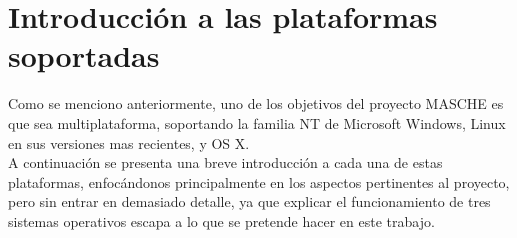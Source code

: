 \section{Introducción a las plataformas soportadas}

Como se menciono anteriormente, uno de los objetivos del proyecto MASCHE es que
sea multiplataforma, soportando la familia NT de Microsoft Windows, Linux en
sus versiones mas recientes, y OS X.\\

A continuación se presenta una breve introducción a cada una de estas
plataformas, enfocándonos principalmente en los aspectos pertinentes al
proyecto, pero sin entrar en demasiado detalle, ya que explicar el
funcionamiento de tres sistemas operativos escapa a lo que se
pretende hacer en este trabajo.\\

